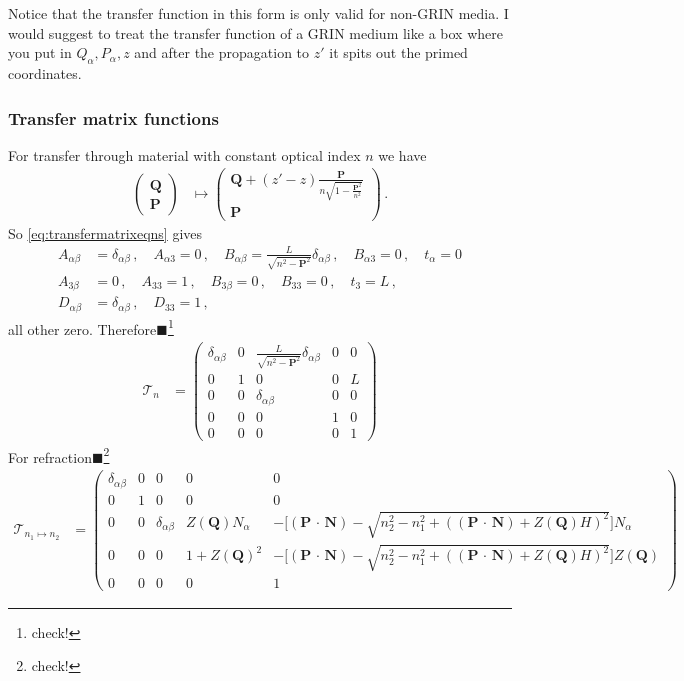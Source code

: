 \documentclass[12pt,a4paper,twoside,openright,BCOR10mm,headsepline,titlepage,abstracton,chapterprefix,final]{scrreprt}
\newcommand\Vector[1]{{\mathbf{#1}}}
\newcommand{\scpm}[2]{(#1\,\cdot\,#2)}
\newcommand{\remark}[1]{{\color{red}$\blacksquare$}\footnote{{\color{red}#1}}}
\begin{document}
Notice that the transfer function in this form is only valid for non-GRIN media. I would suggest to treat the transfer function of a GRIN medium
like a box where you put in $Q_\alpha, P_\alpha, z$ and after the propagation to $z'$ it spits out the primed coordinates.
\subsubsection{Transfer matrix functions}
For transfer through material with constant optical index $n$ we have
\begin{align}
 \begin{pmatrix}
  \Vector{Q} \\
  \Vector{P}
 \end{pmatrix} &\mapsto
 \begin{pmatrix}
  \Vector{Q} + (z' -z) \frac{\Vector{P}}{n \sqrt{1 - \frac{\Vector{P}^2}{n^2}}} \\
  \Vector{P}
 \end{pmatrix}\,.
\end{align}
So \eqref{eq:transfermatrixeqns} gives
\begin{align}
 A_{\alpha\beta} &= \delta_{\alpha\beta}\,,\quad A_{\alpha 3} = 0\,,\quad B_{\alpha\beta} = \frac{L}{\sqrt{n^2 - \Vector{P}^2}} \delta_{\alpha\beta}\,,\quad B_{\alpha3} = 0\,,\quad t_\alpha = 0 \\
 A_{3\beta} &= 0\,,\quad A_{33} = 1\,,\quad B_{3\beta} = 0\,,\quad B_{33} = 0\,,\quad t_3 = L\,,\\
 D_{\alpha\beta} &= \delta_{\alpha\beta}\,,\quad D_{33} = 1\,,
\end{align}
all other zero. Therefore\remark{check!}
\begin{align}
 \mathcal{T}_n &=
 \begin{pmatrix}
  \delta_{\alpha\beta} & 0 &  \frac{L}{\sqrt{n^2 - \Vector{P}^2}} \delta_{\alpha\beta} & 0 & 0\\
   0                   & 1 & 0 & 0 & L\\
   0                   & 0 & \delta_{\alpha\beta} & 0 & 0\\
   0                   & 0 & 0 & 1 & 0 \\
   0 & 0 & 0 & 0 & 1
 \end{pmatrix}
\end{align}
For refraction\remark{check!}
\begin{align}
 \mathcal{T}_{n_1\mapsto n_2} &=
 \begin{pmatrix}
  \delta_{\alpha\beta} & 0 &  0 & 0 & 0\\
   0                   & 1 & 0 & 0 & 0\\
   0                   & 0 & \delta_{\alpha\beta} & Z(\Vector{Q}) N_\alpha & -\biggl[\scpm{\Vector{P}}{\Vector{N}} - \sqrt{n_2^2 - n_1^2 + (\scpm{\Vector{P}}{\Vector{N}} + Z(\Vector{Q}) H)^2}\biggr] N_\alpha \\
   0                   & 0 & 0 & 1 + Z(\Vector{Q})^2 & -\biggl[\scpm{\Vector{P}}{\Vector{N}} - \sqrt{n_2^2 - n_1^2 + (\scpm{\Vector{P}}{\Vector{N}} + Z(\Vector{Q}) H)^2}\biggr] Z(\Vector{Q}) \\
   0 & 0 & 0 & 0 & 1
 \end{pmatrix}
\end{align}
\end{document}
